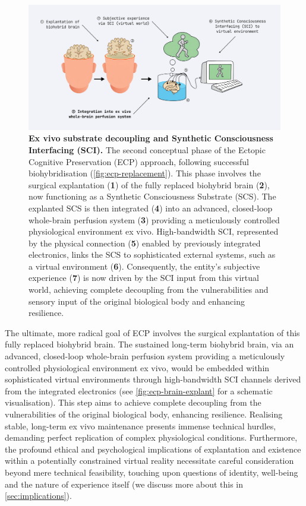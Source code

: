 \documentclass[10pt]{article}
\begin{document}
\begin{sloppypar}
  \begin{figure}[ht]
    \centering
    \includegraphics[width=\textwidth]{figures/ecp-brain-explant.png}
    \caption[ECP: Ex vivo substrate decoupling and synthetic consciousness interfacing]{\textbf{Ex vivo substrate decoupling and Synthetic Consciousness Interfacing (SCI).} The second conceptual phase of the Ectopic Cognitive Preservation (ECP) approach, following successful biohybridisation (\autoref{fig:ecp-replacement}). This phase involves the surgical explantation (\textbf{1}) of the fully replaced biohybrid brain (\textbf{2}), now functioning as a Synthetic Consciousness Substrate (SCS). The explanted SCS is then integrated (\textbf{4}) into an advanced, closed-loop whole-brain perfusion system (\textbf{3}) providing a meticulously controlled physiological environment ex vivo. High-bandwidth SCI, represented by the physical connection (\textbf{5}) enabled by previously integrated electronics, links the SCS to sophisticated external systems, such as a virtual environment (\textbf{6}). Consequently, the entity’s subjective experience (\textbf{7}) is now driven by the SCI input from this virtual world, achieving complete decoupling from the vulnerabilities and sensory input of the original biological body and enhancing resilience.}
    \label{fig:ecp-brain-explant}
  \end{figure}

  The ultimate, more radical goal of ECP involves the surgical explantation of this fully replaced biohybrid brain. The sustained long-term biohybrid brain, via an advanced, closed-loop whole-brain perfusion system providing a meticulously controlled physiological environment ex vivo, would be embedded within sophisticated virtual environments through high-bandwidth SCI channels derived from the integrated electronics (see \autoref{fig:ecp-brain-explant} for a schematic visualisation). This step aims to achieve complete decoupling from the vulnerabilities of the original biological body, enhancing resilience. Realising stable, long-term ex vivo maintenance presents immense technical hurdles, demanding perfect replication of complex physiological conditions. Furthermore, the profound ethical and psychological implications of explantation and existence within a potentially constrained virtual reality necessitate careful consideration beyond mere technical feasibility, touching upon questions of identity, well-being and the nature of experience itself (we discuss more about this in \autoref{sec:implications}).



\end{sloppypar}
\end{document}
